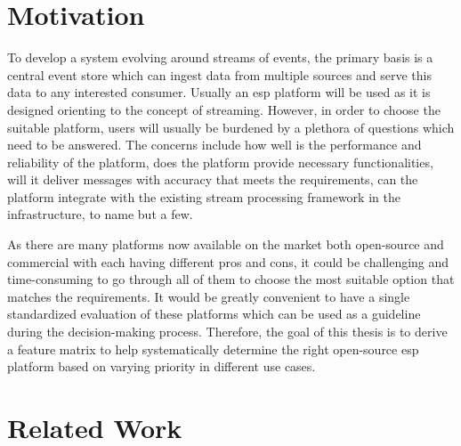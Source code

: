 \section{Motivation}
To develop a system evolving around streams of events, the primary basis is a central event store which can ingest data from multiple sources and serve this data to any interested consumer. Usually an \acrshort{esp} platform will be used as it is designed orienting to the concept of streaming. However, in order to choose the suitable platform, users will usually be burdened by a plethora of questions which need to be answered. The concerns include how well is the performance and reliability of the platform, does the platform provide necessary functionalities, will it deliver messages with accuracy that meets the requirements, can the platform integrate with the existing stream processing framework in the infrastructure, to name but a few.

As there are many platforms now available on the market both open-source and commercial with each having different pros and cons, it could be challenging and time-consuming to go through all of them to choose the most suitable option that matches the requirements. It would be greatly convenient to have a single standardized evaluation of these platforms which can be used as a guideline during the decision-making process. Therefore, the goal of this thesis is to derive a feature matrix to help systematically determine the right open-source \acrshort{esp} platform based on varying priority in different use cases. 


\section{Related Work}

